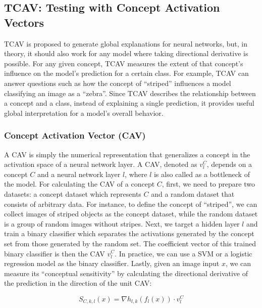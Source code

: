 \documentclass[
  12pt,
]{krantz}
\begin{document}
\hypertarget{tcav-testing-with-concept-activation-vectors}{%
\subsection{TCAV: Testing with Concept Activation Vectors}\label{tcav-testing-with-concept-activation-vectors}}

TCAV is proposed to generate global explanations for neural networks, but, in theory, it should also work for any model where taking directional derivative is possible.
For any given concept, TCAV measures the extent of that concept's influence on the model's prediction for a certain class.
For example, TCAV can answer questions such as how the concept of ``striped'' influences a model classifying an image as a ``zebra''.
Since TCAV describes the relationship between a concept and a class, instead of explaining a single prediction, it provides useful global interpretation for a model's overall behavior.

\hypertarget{concept-activation-vector-cav}{%
\subsubsection{Concept Activation Vector (CAV)}\label{concept-activation-vector-cav}}

A CAV is simply the numerical representation that generalizes a concept in the activation space of a neural network layer.
A CAV, denoted as \(v_l^C\), depends on a concept \(C\) and a neural network layer \(l\), where \(l\) is also called as a bottleneck of the model.
For calculating the CAV of a concept \(C\), first, we need to prepare two datasets: a concept dataset which represents \(C\) and a random dataset that consists of arbitrary data.
For instance, to define the concept of ``striped'', we can collect images of striped objects as the concept dataset, while the random dataset is a group of random images without stripes.
Next, we target a hidden layer \(l\) and train a binary classifier which separates the activations generated by the concept set from those generated by the random set.
The coefficient vector of this trained binary classifier is then the CAV \(v_l^C\).
In practice, we can use a SVM or a logistic regression model as the binary classifier.
Lastly, given an image input \(x\), we can measure its ``conceptual sensitivity'' by calculating the directional derivative of the prediction in the direction of the unit CAV:

\[S_{C,k,l}(x)=\nabla h_{l,k}(f_l(x))\cdot v_l^C\]
\end{document}
